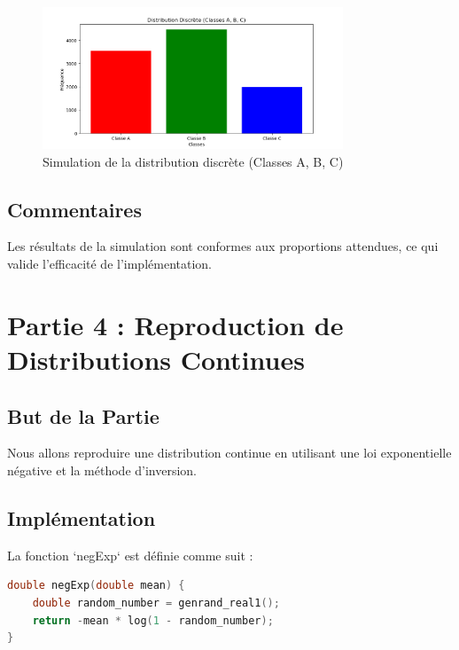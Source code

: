 \documentclass[a4paper,12pt]{report}
\begin{document}
\begin{figure}[h!]
    \centering
    \includegraphics[width=0.8\textwidth]{3.png}
    \caption{Simulation de la distribution discrète (Classes A, B, C)}
\end{figure}

\subsection*{Commentaires}
Les résultats de la simulation sont conformes aux proportions attendues, ce qui valide l'efficacité de l'implémentation.

\newpage
\section*{Partie 4 : Reproduction de Distributions Continues}

\subsection*{But de la Partie}
Nous allons reproduire une distribution continue en utilisant une loi exponentielle négative et la méthode d'inversion.

\subsection*{Implémentation}
La fonction `negExp` est définie comme suit :

\begin{lstlisting}[language=C]
double negExp(double mean) {
    double random_number = genrand_real1();
    return -mean * log(1 - random_number);
}
\end{lstlisting}
\end{document}
